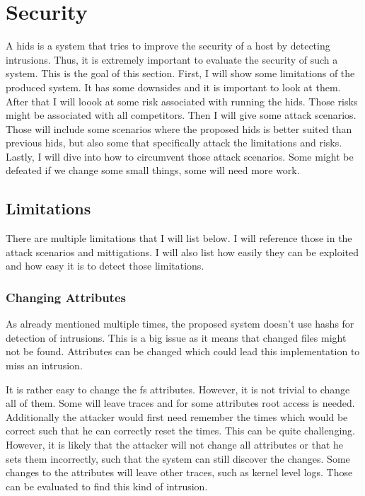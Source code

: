 
\section{Security}
\label{sec:Security}

A \gls{hids} is a system that tries to improve the security of a host by detecting intrusions. Thus, it is extremely important to evaluate the security of such a system. This is the goal of this section. First, I will show some limitations of the produced system. It has some downsides and it is important to look at them. After that I will loook at some risk associated with running the \gls{hids}. Those risks might be associated with all competitors. Then I will give some attack scenarios. Those will include some scenarios where the proposed \gls{hids} is better suited than previous \gls{hids}, but also some that specifically attack the limitations and risks. Lastly, I will dive into how to circumvent those attack scenarios. Some might be defeated if we change some small things, some will need more work.

\subsection{Limitations}
\label{sec:Limitations}

There are multiple limitations that I will list below. I will reference those in the attack scenarios and mittigations. I will also list how easily they can be exploited and how easy it is to detect those limitations.

\subsubsection{Changing Attributes}
\label{sec:limitation:chattr}
As already mentioned multiple times, the proposed system doesn't use \glspl{hash} for detection of intrusions. This is a big issue as it means that changed files might not be found. Attributes can be changed which could lead this implementation to miss an intrusion.  \cite{chaning:times, changing:attributes}

It is rather easy to change the \gls{fs} attributes. However, it is not trivial to change all of them. Some will leave traces and for some attributes root access is needed. Additionally the attacker would first need remember the times which would be correct such that he can correctly reset the times. This can be quite challenging. However, it is likely that the attacker will not change all attributes or that he sets them incorrectly, such that the system can still discover the changes. Some changes to the attributes will leave other traces, such as kernel level logs. Those can be evaluated to find this kind of intrusion.

